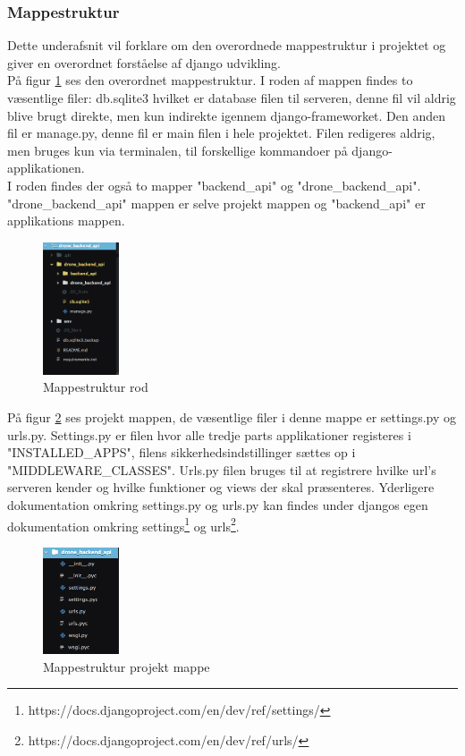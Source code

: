 \subsubsection*{Mappestruktur}
Dette underafsnit vil forklare om den overordnede mappestruktur i projektet og giver en overordnet forståelse af django udvikling. \\

På figur \ref{fig:mappestruktur_1} ses den overordnet mappestruktur. I roden af mappen findes to væsentlige filer: db.sqlite3 hvilket er database filen til serveren, denne fil vil aldrig blive brugt direkte, men kun indirekte igennem django-frameworket. Den anden fil er manage.py, denne fil er main filen i hele projektet. Filen redigeres aldrig, men bruges kun via terminalen, til forskellige kommandoer på django-applikationen. \\

I roden findes der også to mapper "backend\_api" og "drone\_backend\_api". "drone\_backend\_api"  mappen er selve projekt mappen og "backend\_api" er applikations mappen.

\begin{figure}[H]
	\centering
	\includegraphics[width=0.2\textwidth]{Billeder/implementation/mappestruktur_1.png}
	\caption{Mappestruktur rod}
	\label{fig:mappestruktur_1}
\end{figure}

På figur \ref{fig:mappestruktur_2} ses projekt mappen, de væsentlige filer i denne mappe er settings.py og urls.py.
Settings.py er filen hvor alle tredje parts applikationer registeres i "INSTALLED\_APPS", filens sikkerhedsindstillinger  sættes op i "MIDDLEWARE\_CLASSES". 
Urls.py filen bruges til at registrere hvilke url's serveren kender og hvilke funktioner og views der skal præsenteres. Yderligere dokumentation omkring settings.py og urls.py kan findes under djangos egen dokumentation omkring settings\footnote{https://docs.djangoproject.com/en/dev/ref/settings/} og urls\footnote{https://docs.djangoproject.com/en/dev/ref/urls/}.

\begin{figure}[H]
	\centering
	\includegraphics[width=0.2\textwidth]{Billeder/implementation/mappestruktur_2.png}
	\caption{Mappestruktur projekt mappe}
	\label{fig:mappestruktur_2}
\end{figure}

